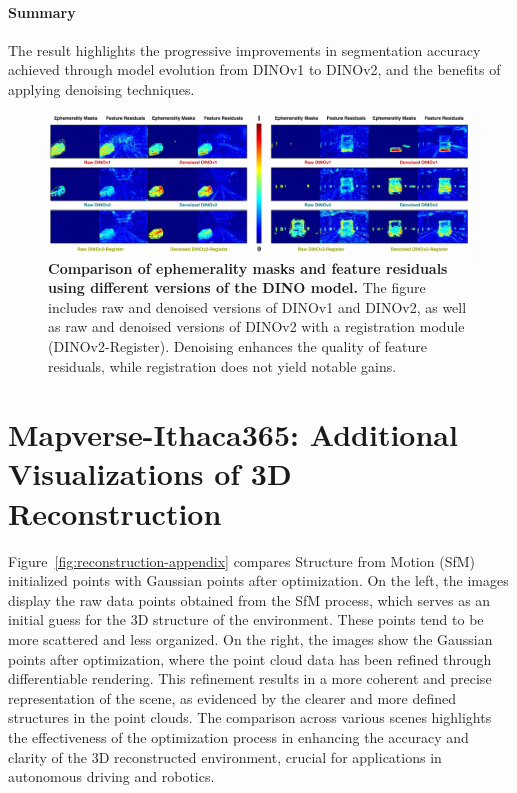\paragraph{Summary} The result highlights the progressive improvements in segmentation accuracy achieved through model evolution from DINOv1 to DINOv2, and the benefits of applying denoising techniques. 

\vspace{5mm}
\begin{figure}[ht]
\begin{center}
\centerline{\includegraphics[width=\columnwidth]{figs_compressed/ablation-backbone_compressed.pdf}}
\caption{\textbf{Comparison of ephemerality masks and feature residuals using different versions of the DINO model.} The figure includes raw and denoised versions of DINOv1 and DINOv2, as well as raw and denoised versions of DINOv2 with a registration module (DINOv2-Register). Denoising enhances the quality of feature residuals, while registration does not yield notable gains.}
\label{fig:ablation-backbone-appendix}
\end{center}
\end{figure}



\clearpage



\section{Mapverse-Ithaca365: Additional Visualizations of 3D Reconstruction}
Figure~\ref{fig:reconstruction-appendix} compares Structure from Motion (SfM) initialized points with Gaussian points after optimization. On the left, the images display the raw data points obtained from the SfM process, which serves as an initial guess for the 3D structure of the environment. These points tend to be more scattered and less organized. On the right, the images show the Gaussian points after optimization, where the point cloud data has been refined through differentiable rendering. This refinement results in a more coherent and precise representation of the scene, as evidenced by the clearer and more defined structures in the point clouds. The comparison across various scenes highlights the effectiveness of the optimization process in enhancing the accuracy and clarity of the 3D reconstructed environment, crucial for applications in autonomous driving and robotics. 

